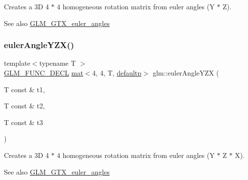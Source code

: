 Creates a 3D 4 $\ast$ 4 homogeneous rotation matrix from euler angles (Y $\ast$ Z). \begin{DoxySeeAlso}{See also}
\hyperlink{group__gtx__euler__angles}{G\+L\+M\+\_\+\+G\+T\+X\+\_\+euler\+\_\+angles} 
\end{DoxySeeAlso}
\mbox{\label{group__gtx__euler__angles_ga08bef16357b8f9b3051b3dcaec4b7848}} 
\subsubsection{\texorpdfstring{euler\+Angle\+Y\+Z\+X()}{eulerAngleYZX()}}
{\footnotesize\ttfamily template$<$typename T $>$ \\
\hyperlink{setup_8hpp_ab2d052de21a70539923e9bcbf6e83a51}{G\+L\+M\+\_\+\+F\+U\+N\+C\+\_\+\+D\+E\+CL} \hyperlink{structglm_1_1mat}{mat}$<$4, 4, T, \hyperlink{namespaceglm_a36ed105b07c7746804d7fdc7cc90ff25a9d21ccd8b5a009ec7eb7677befc3bf51}{defaultp}$>$ glm\+::euler\+Angle\+Y\+ZX (\begin{DoxyParamCaption}\item[{T const \&}]{t1,  }\item[{T const \&}]{t2,  }\item[{T const \&}]{t3 }\end{DoxyParamCaption})}

Creates a 3D 4 $\ast$ 4 homogeneous rotation matrix from euler angles (Y $\ast$ Z $\ast$ X). \begin{DoxySeeAlso}{See also}
\hyperlink{group__gtx__euler__angles}{G\+L\+M\+\_\+\+G\+T\+X\+\_\+euler\+\_\+angles} 
\end{DoxySeeAlso}
\mbox{\label{group__gtx__euler__angles_ga5e5e40abc27630749b42b3327c76d6e4}} 

